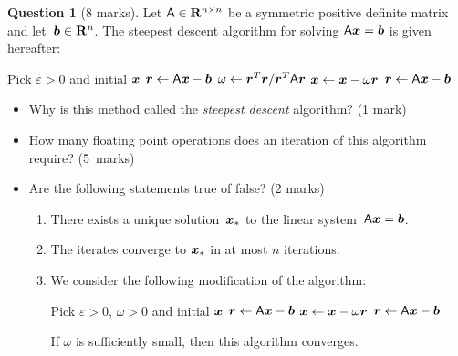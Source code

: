 \documentclass[11pt]{article}
\theoremstyle{definition}
\newtheorem{question}{Question}
\begin{document}
\newpage
\begin{question}
    [8 marks]
    Let $\mathsf A \in \mathbf R^{n \times n}$ be a symmetric positive definite matrix and let~$\mathbf{\boldsymbol{b}} \in \mathbf R^{n}$.
    The steepest descent algorithm for solving $\mathsf A \mathbf{\boldsymbol{x}} = \mathbf{\boldsymbol{b}}$ is given hereafter:

    \begin{center}
    \begin{algorithmic}
    \State Pick $\varepsilon > 0$ and initial $\mathbf{\boldsymbol{x}}$%
    \State $\mathbf{\boldsymbol{r}} \gets \mathsf A \mathbf{\boldsymbol{x}} - \mathbf{\boldsymbol{b}}$%
        \State $\omega \gets \mathbf{\boldsymbol{r}}^T \mathbf{\boldsymbol{r}}/\mathbf{\boldsymbol{r}}^T \mathsf A \mathbf{\boldsymbol{r}}$
        \State $\mathbf{\boldsymbol{x}} \gets \mathbf{\boldsymbol{x}} - \omega \mathbf{\boldsymbol{r}}$
        \State $\mathbf{\boldsymbol{r}} \gets \mathsf A \mathbf{\boldsymbol{x}} - \mathbf{\boldsymbol{b}}$
    \EndWhile
    \end{algorithmic}
    \end{center}

    \noindent
    \begin{itemize}
        \item
            Why is this method called the \emph{steepest descent} algorithm? (1 mark)

        \item
            How many floating point operations does an iteration of this algorithm require? (5~marks)

        \item Are the following statements true of false? (2 marks)
        \begin{enumerate}
            \item
                There exists a unique solution~$\mathbf{\boldsymbol{x}}_*$ to the linear system~\( \mathsf A \mathbf{\boldsymbol{x}} = \mathbf{\boldsymbol{b}} \).

            \item
                The iterates converge to $\mathbf{\boldsymbol{x}}_*$ in at most $n$ iterations.

            \item
                We consider the following modification of the algorithm:
                \begin{center}
                \begin{algorithmic}
                \State Pick $\varepsilon > 0$, $\omega > 0$ and initial $\mathbf{\boldsymbol{x}}$%
                \State $\mathbf{\boldsymbol{r}} \gets \mathsf A \mathbf{\boldsymbol{x}} - \mathbf{\boldsymbol{b}}$%
                    \State $\mathbf{\boldsymbol{x}} \gets \mathbf{\boldsymbol{x}} - \omega \mathbf{\boldsymbol{r}}$
                    \State $\mathbf{\boldsymbol{r}} \gets \mathsf A \mathbf{\boldsymbol{x}} - \mathbf{\boldsymbol{b}}$
                \EndWhile
                \end{algorithmic}
                \end{center}
                If $\omega$ is sufficiently small, then this algorithm converges.


\end{enumerate}
\end{itemize}
\end{question}
\end{document}
